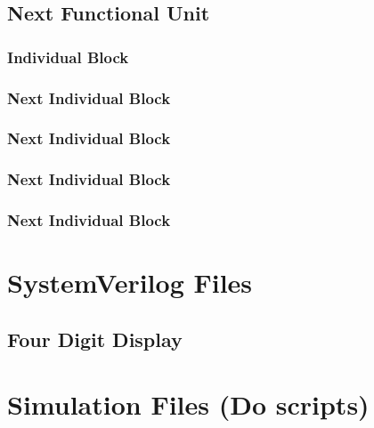 \documentclass[a4paper]{article}
\begin{document}
\subsection{Next Functional Unit}
\subsubsection{Individual Block}
\subsubsection{Next Individual Block}
\subsubsection{Next Individual Block}
\subsubsection{Next Individual Block}
\subsubsection{Next Individual Block}

\appendix
\section{SystemVerilog Files}

\subsection{Four Digit Display}




\section{Simulation Files (Do scripts)}


%
%
\end{document}
